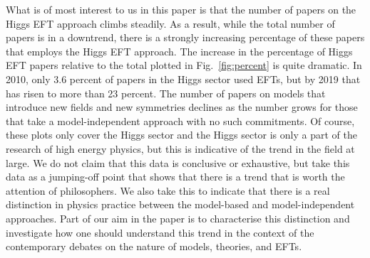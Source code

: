 What is of most interest to us in this paper is that the number of papers on the Higgs EFT approach climbs steadily. 
As a result, while the total number of papers is in a downtrend, there is a strongly increasing percentage of these papers that employs the Higgs EFT approach. 
The increase in the percentage of Higgs EFT papers relative to the total plotted in Fig.~\ref{fig:percent} is quite dramatic.
In 2010, only 3.6 percent of papers in the Higgs sector used EFTs, but by 2019 that has risen to more than 23 percent.
The number of papers on models that introduce new fields and new symmetries declines as the number grows for those that take a model-independent approach with no such commitments. 
Of course, these plots only cover the Higgs sector and the Higgs sector is only a part of the research of high energy physics, but this is indicative of the trend in the field at large. 
We do not claim that this data is conclusive or exhaustive, but take this data as a jumping-off point that shows that there is a trend that is worth the attention of philosophers.
We also take this to indicate that there is a real distinction in physics practice between the model-based and model-independent approaches.  
Part of our aim in the paper is to characterise this distinction and investigate how one should understand this trend in the context of the contemporary debates on the nature of models, theories, and EFTs.
